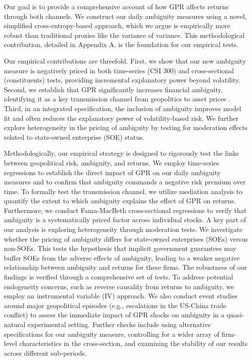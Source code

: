 \documentclass[preprint,12pt,authoryear]{elsarticle}
\begin{document}
Our goal is to provide a comprehensive account of how GPR affects returns through both channels. We construct our daily ambiguity measures using a novel, simplified cross-entropy-based approach, which we argue is empirically more robust than traditional proxies like the variance of variance. This methodological contribution, detailed in Appendix A, is the foundation for our empirical tests.

Our empirical contributions are threefold. First, we show that our new ambiguity measure is negatively priced in both time-series (CSI 300) and cross-sectional (constituents) tests, providing incremental explanatory power beyond volatility. Second, we establish that GPR significantly increases financial ambiguity, identifying it as a key transmission channel from geopolitics to asset prices \citep{Caldara2022}. Third, in an integrated specification, the inclusion of ambiguity improves model fit and often reduces the explanatory power of volatility-based risk. We further explore heterogeneity in the pricing of ambiguity by testing for moderation effects related to state-owned enterprise (SOE) status.

Methodologically, our empirical strategy is designed to rigorously test the links between geopolitical risk, ambiguity, and returns. We employ time-series regressions to establish the direct impact of GPR on our daily ambiguity measures and to confirm that ambiguity commands a negative risk premium over time. To formally test the transmission channel, we utilize mediation analysis to quantify the extent to which ambiguity explains the effect of GPR on returns. Furthermore, we conduct Fama-MacBeth cross-sectional regressions to verify that ambiguity is a systematically priced factor across individual stocks. A key part of our analysis is exploring heterogeneity through moderation tests. We investigate whether the pricing of ambiguity differs for state-owned enterprises (SOEs) versus non-SOEs. This tests the hypothesis that implicit government guarantees may buffer SOEs from the adverse effects of ambiguity, leading to a weaker negative relationship between ambiguity and returns for these firms. The robustness of our findings is verified through a comprehensive set of tests. To address potential endogeneity concerns, such as reverse causality from returns to ambiguity, we employ an instrumental variable (IV) approach. We also conduct event studies around major geopolitical episodes (e.g., escalations in the US-China trade conflict) to assess the immediate impact of GPR shocks on ambiguity in a quasi-natural experimental setting. Further checks include using alternative specifications for our ambiguity measure, controlling for a wider array of firm-level characteristics in the cross-section, and examining the stability of our results across different sub-periods.
\end{document}
